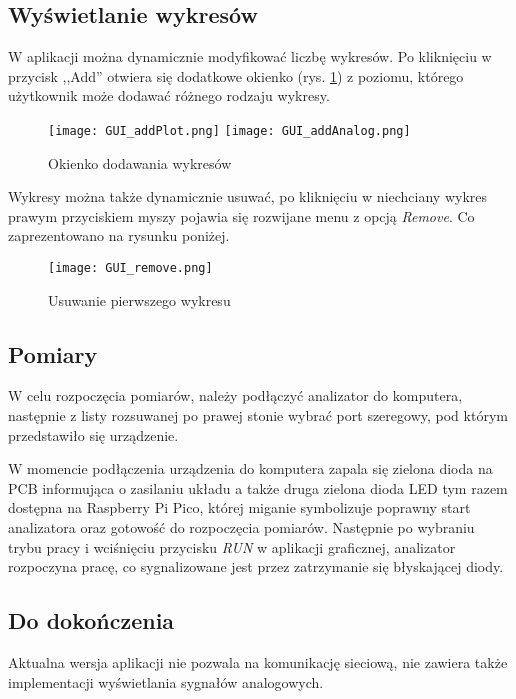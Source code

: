     \subsection{Wyświetlanie wykresów}
        W aplikacji można dynamicznie modyfikować liczbę wykresów.
        Po kliknięciu w przycisk ,,Add'' otwiera się dodatkowe okienko (rys. \ref{fig:gui_addPlot}) z poziomu,
        którego użytkownik może dodawać różnego rodzaju wykresy.
        \begin{figure}[!ht]
            \centering
            \texttt{[image: GUI\_addPlot.png]}
            \texttt{[image: GUI\_addAnalog.png]}
            \caption{Okienko dodawania wykresów}
            \label{fig:gui_addPlot}
        \end{figure}

        Wykresy można także dynamicznie usuwać, po kliknięciu w niechciany wykres prawym przyciskiem myszy pojawia się rozwijane menu z opcją \textit{Remove}.
        Co zaprezentowano na rysunku poniżej.

        \begin{figure}[!ht]
            \centering
            \texttt{[image: GUI\_remove.png]}
            \caption{Usuwanie pierwszego wykresu}
            \label{fig:gui_removePlot}
        \end{figure}

    
    \subsection{Pomiary}
        W celu rozpoczęcia pomiarów, należy podłączyć analizator do komputera, 
        następnie z listy rozsuwanej po prawej stonie wybrać port szeregowy,
        pod którym przedstawiło się urządzenie.

        W momencie podłączenia urządzenia do komputera zapala się zielona dioda na PCB informująca o zasilaniu układu a także
        druga zielona dioda LED tym razem dostępna na Raspberry Pi Pico, której miganie symbolizuje poprawny start analizatora oraz gotowość do rozpoczęcia pomiarów.
        Następnie po wybraniu trybu pracy i wciśnięciu przycisku \textit{RUN} w aplikacji graficznej, analizator rozpoczyna pracę,
        co sygnalizowane jest przez zatrzymanie się błyskającej diody.
    
    \subsection{Do dokończenia}
        Aktualna wersja aplikacji nie pozwala na komunikację sieciową, nie zawiera także implementacji wyświetlania sygnałów analogowych.

